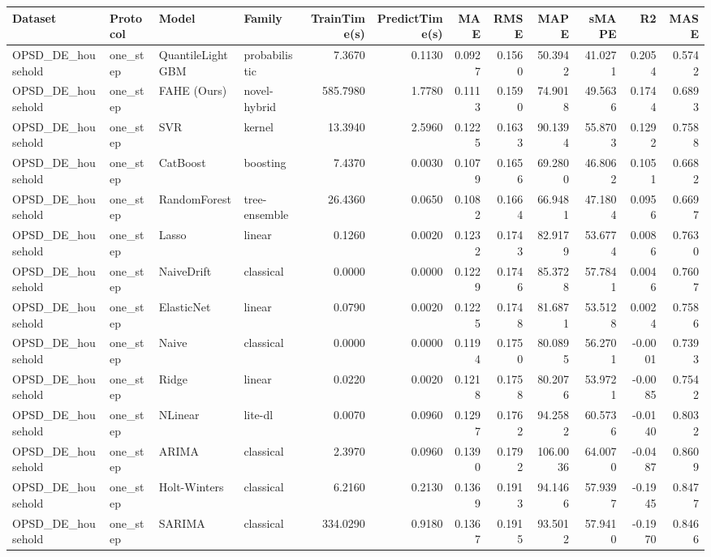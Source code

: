 \begin{tabular}{llllrrrrrrrr}
\toprule
Dataset & Protocol & Model & Family & TrainTime(s) & PredictTime(s) & MAE & RMSE & MAPE & sMAPE & R2 & MASE \\
\midrule
OPSD_DE_household & one_step & QuantileLightGBM & probabilistic & 7.3670 & 0.1130 & 0.0927 & 0.1560 & 50.3942 & 41.0271 & 0.2054 & 0.5742 \\
OPSD_DE_household & one_step & FAHE (Ours) & novel-hybrid & 585.7980 & 1.7780 & 0.1113 & 0.1590 & 74.9018 & 49.5636 & 0.1744 & 0.6893 \\
OPSD_DE_household & one_step & SVR & kernel & 13.3940 & 2.5960 & 0.1225 & 0.1633 & 90.1394 & 55.8703 & 0.1292 & 0.7588 \\
OPSD_DE_household & one_step & CatBoost & boosting & 7.4370 & 0.0030 & 0.1079 & 0.1656 & 69.2800 & 46.8062 & 0.1051 & 0.6682 \\
OPSD_DE_household & one_step & RandomForest & tree-ensemble & 26.4360 & 0.0650 & 0.1082 & 0.1664 & 66.9481 & 47.1804 & 0.0956 & 0.6697 \\
OPSD_DE_household & one_step & Lasso & linear & 0.1260 & 0.0020 & 0.1232 & 0.1743 & 82.9179 & 53.6774 & 0.0086 & 0.7630 \\
OPSD_DE_household & one_step & NaiveDrift & classical & 0.0000 & 0.0000 & 0.1229 & 0.1746 & 85.3728 & 57.7841 & 0.0046 & 0.7607 \\
OPSD_DE_household & one_step & ElasticNet & linear & 0.0790 & 0.0020 & 0.1225 & 0.1748 & 81.6871 & 53.5128 & 0.0024 & 0.7586 \\
OPSD_DE_household & one_step & Naive & classical & 0.0000 & 0.0000 & 0.1194 & 0.1750 & 80.0895 & 56.2701 & -0.0001 & 0.7393 \\
OPSD_DE_household & one_step & Ridge & linear & 0.0220 & 0.0020 & 0.1218 & 0.1758 & 80.2076 & 53.9721 & -0.0085 & 0.7542 \\
OPSD_DE_household & one_step & NLinear & lite-dl & 0.0070 & 0.0960 & 0.1297 & 0.1762 & 94.2582 & 60.5736 & -0.0140 & 0.8032 \\
OPSD_DE_household & one_step & ARIMA & classical & 2.3970 & 0.0960 & 0.1390 & 0.1792 & 106.0036 & 64.0070 & -0.0487 & 0.8609 \\
OPSD_DE_household & one_step & Holt-Winters & classical & 6.2160 & 0.2130 & 0.1369 & 0.1913 & 94.1466 & 57.9397 & -0.1945 & 0.8477 \\
OPSD_DE_household & one_step & SARIMA & classical & 334.0290 & 0.9180 & 0.1367 & 0.1915 & 93.5012 & 57.9410 & -0.1970 & 0.8466 \\

\end{tabular}
